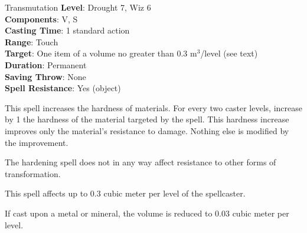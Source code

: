 {Transmutation}
{
	\textbf{Level}: Drought 7, Wiz 6\\	
	\textbf{Components}: V, S\\	
	\textbf{Casting Time}: 1 standard action\\	
	\textbf{Range}: Touch\\	
	\textbf{Target}: One item of a volume no greater than 0.3 m$^3$/level (see text)\\	
	\textbf{Duration}: Permanent\\	
	\textbf{Saving Throw}: None\\	
	\textbf{Spell Resistance}: Yes (object)\\
}
{
	This spell increases the hardness of materials. For every two caster levels, increase by 1 the hardness of the material targeted by the spell. This hardness increase improves only the material's resistance to damage. Nothing else is modified by the improvement.

	The hardening spell does not in any way affect resistance to other forms of transformation.

	This spell affects up to 0.3 cubic meter per level of the spellcaster.

	If cast upon a metal or mineral, the volume is reduced to 0.03 cubic meter per level.
}